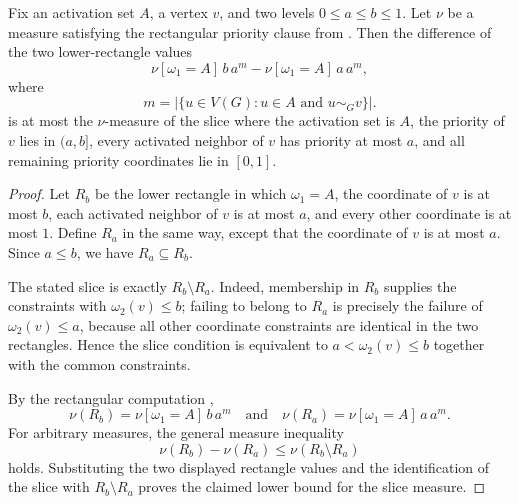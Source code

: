 \begin{helper}
Fix an activation set $A$, a vertex $v$, and two levels $0\le a\le b\le 1$.
Let $\nu$ be a measure satisfying the rectangular priority clause from
.  Then the difference of the two
lower-rectangle values
\[
\nu[\omega_1=A]\,b\,a^m-\nu[\omega_1=A]\,a\,a^m,
\]
where
\[
m=\left|\{u\in V(G):u\in A\text{ and }u\sim_G v\}\right|.
\]
is at most the $\nu$-measure of the slice where the activation set is $A$,
the priority of $v$ lies in $(a,b]$, every activated neighbor of $v$ has
priority at most $a$, and all remaining priority coordinates lie in $[0,1]$.
\end{helper}
\begin{proof}
Let $R_b$ be the lower rectangle in which $\omega_1=A$, the coordinate of
$v$ is at most $b$, each activated neighbor of $v$ is at most $a$, and every
other coordinate is at most $1$.  Define $R_a$ in the same way, except that
the coordinate of $v$ is at most $a$.  Since $a\le b$, we have
$R_a\subseteq R_b$.

The stated slice is exactly $R_b\setminus R_a$.  Indeed, membership in
$R_b$ supplies the constraints with $\omega_2(v)\le b$; failing to belong to
$R_a$ is precisely the failure of $\omega_2(v)\le a$, because all other
coordinate constraints are identical in the two rectangles.  Hence the slice
condition is equivalent to $a<\omega_2(v)\le b$ together with the common
constraints.

By the rectangular computation ,
\[
\nu(R_b)=\nu[\omega_1=A]\,
b\,a^m
\quad\text{and}\quad
\nu(R_a)=\nu[\omega_1=A]\,
a\,a^m.
\]
For arbitrary measures, the general measure inequality
\[
\nu(R_b)-\nu(R_a)\le \nu(R_b\setminus R_a)
\]
holds.  Substituting the two displayed rectangle values and the identification
of the slice with $R_b\setminus R_a$ proves the claimed lower bound for the
slice measure.
\end{proof}
